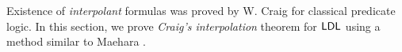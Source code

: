 Existence of \emph{interpolant} formulas was proved by W. Craig \cite{CraigA} for classical predicate logic. In this section, we prove \emph{Craig's interpolation} theorem for $\mathsf{LDL}$ using a method similar to Maehara \cite{maehara1960interpolation}.


